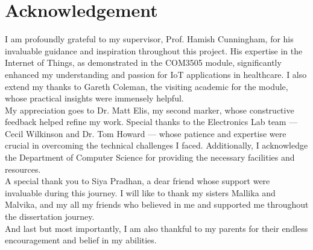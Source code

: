 \chapter*{\Large \center Acknowledgement}

I am profoundly grateful to my supervisor, Prof. Hamish Cunningham, for his invaluable guidance and inspiration throughout this project. His expertise in the Internet of Things, as demonstrated in the COM3505 module, significantly enhanced my understanding and passion for IoT applications in healthcare. I also extend my thanks to Gareth Coleman, the visiting academic for the module, whose practical insights were immensely helpful. \\

\noindent My appreciation goes to Dr. Matt Elis, my second marker, whose constructive feedback helped refine my work. Special thanks to the Electronics Lab team — Cecil Wilkinson and Dr. Tom Howard — whose patience and expertise were crucial in overcoming the technical challenges I faced. Additionally, I acknowledge the Department of Computer Science for providing the necessary facilities and resources. \\

\noindent A special thank you to Siya Pradhan, a dear friend whose support were invaluable during this journey. I will like to thank my sisters Mallika and Malvika, and my all my friends who believed in me and supported me throughout the dissertation journey.\\

\noindent And last but most importantly, I am also thankful to my parents for their endless encouragement and belief in my abilities. 